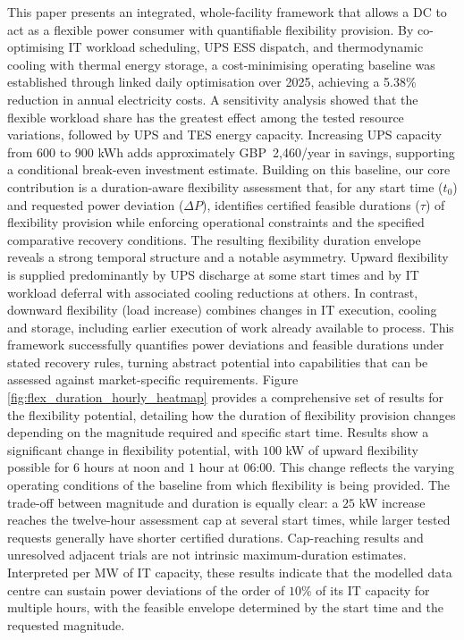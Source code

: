 \documentclass[lettersize,journal]{IEEEtran}
\begin{document}
This paper presents an integrated, whole-facility framework that allows a DC to act as a flexible power consumer with quantifiable flexibility provision. By co-optimising IT workload scheduling, UPS ESS dispatch, and thermodynamic cooling with thermal energy storage, a cost-minimising operating baseline was established through linked daily optimisation over 2025, achieving a 5.38\% reduction in annual electricity costs. A sensitivity analysis showed that the flexible workload share has the greatest effect among the tested resource variations, followed by UPS and TES energy capacity. Increasing UPS capacity from 600 to 900 kWh adds approximately GBP~2,460/year in savings, supporting a conditional break-even investment estimate. Building on this baseline, our core contribution is a duration-aware flexibility assessment that, for any start time ($t_0$) and requested power deviation ($\Delta P$), identifies certified feasible durations ($\tau$) of flexibility provision while enforcing operational constraints and the specified comparative recovery conditions. The resulting flexibility duration envelope reveals a strong temporal structure and a notable asymmetry. Upward flexibility is supplied predominantly by UPS discharge at some start times and by IT workload deferral with associated cooling reductions at others. In contrast, downward flexibility (load increase) combines changes in IT execution, cooling and storage, including earlier execution of work already available to process. This framework successfully quantifies power deviations and feasible durations under stated recovery rules, turning abstract potential into capabilities that can be assessed against market-specific requirements. Figure \ref{fig:flex_duration_hourly_heatmap} provides a comprehensive set of results for the flexibility potential, detailing how the duration of flexibility provision changes depending on the magnitude required and specific start time. Results show a significant change in flexibility potential, with $100$ kW of upward flexibility possible for $6$ hours at noon and $1$ hour at $06$:$00$. This change reflects the varying operating conditions of the baseline from which flexibility is being provided. The trade-off between magnitude and duration is equally clear: a $25$ kW increase reaches the twelve-hour assessment cap at several start times, while larger tested requests generally have shorter certified durations. Cap-reaching results and unresolved adjacent trials are not intrinsic maximum-duration estimates. Interpreted per MW of IT capacity, these results indicate that the modelled data centre can sustain power deviations of the order of $10\%$ of its IT capacity for multiple hours, with the feasible envelope determined by the start time and the requested magnitude.
\end{document}
